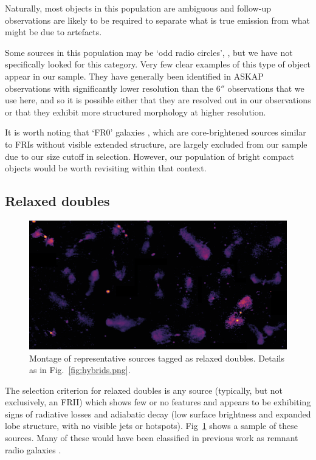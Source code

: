 \documentclass{aa}
\begin{document}
Naturally, most objects in this population are ambiguous and follow-up observations are likely to be required to separate what is true emission from what might be due to artefacts.

Some sources in this population may be `odd radio circles', \cite[e.g.,][]{norris21}, but we have not specifically looked for this category. Very few clear examples of this type of object appear in our sample. They have generally been identified in ASKAP observations with significantly lower resolution than the $6''$ observations that we use here, and so it is possible either that they are resolved out in our observations or that they exhibit more structured morphology at higher resolution.

It is worth noting that `FR0' galaxies \citep{baldi16,garofalo19}, which are core-brightened sources similar to FRIs without visible extended structure, are largely excluded from our sample due to our size cutoff in selection. However, our population of bright compact objects would be worth revisiting within that context.

\subsection{Relaxed doubles}
\label{sec:relaxed}
\begin{figure}
\includegraphics[width=1\linewidth]{Images/galaxies/relaxed.png}
\caption{Montage of representative sources tagged as relaxed doubles. Details as in Fig.\ \ref{fig:hybrids.png}.}
\label{fig:relaxed.png}
\end{figure}

The selection criterion for relaxed doubles is any source (typically, but not exclusively, an FRII) which shows few or no features and appears to be exhibiting signs of radiative losses and adiabatic decay (low surface brightness and expanded lobe structure, with no visible jets or hotspots). Fig~\ref{fig:relaxed.png} shows a sample of these sources. Many of these would have been classified in previous work as remnant radio galaxies \citep{Parma+07,Brienza+17}.
\end{document}
